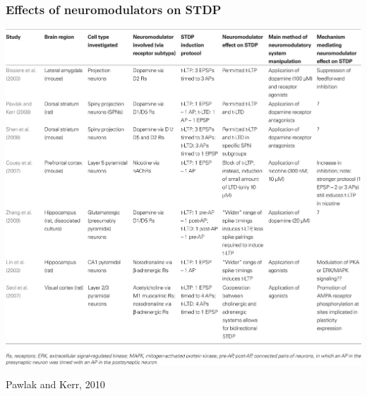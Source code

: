\documentclass{beamer}
\begin{document}
\begin{frame}
\frametitle{Effects of neuromodulators on STDP}

    \includegraphics[width=\textwidth]{./figures/effect_table}

    \tiny{Pawlak and Kerr, 2010}

\end{frame}
\end{document}
